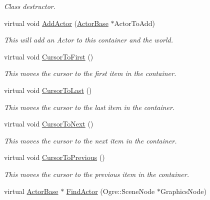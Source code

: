 \begin{DoxyCompactItemize}
\begin{DoxyCompactList}\small\item\em Class destructor. \item\end{DoxyCompactList}\item 
virtual void \hyperlink{classMezzanine_1_1ActorContainerVector_a1341d51fa9ed279301eed579a2de79b2}{AddActor} (\hyperlink{classMezzanine_1_1ActorBase}{ActorBase} $\ast$ActorToAdd)
\begin{DoxyCompactList}\small\item\em This will add an Actor to this container and the world. \item\end{DoxyCompactList}\item 
virtual void \hyperlink{classMezzanine_1_1ActorContainerVector_a2b09e4eac9bc6392f47dd81fb7592ce3}{CursorToFirst} ()
\begin{DoxyCompactList}\small\item\em This moves the cursor to the first item in the container. \item\end{DoxyCompactList}\item 
virtual void \hyperlink{classMezzanine_1_1ActorContainerVector_ae80f9d94f009293528bf1b4251bc8ad0}{CursorToLast} ()
\begin{DoxyCompactList}\small\item\em This moves the cursor to the last item in the container. \item\end{DoxyCompactList}\item 
virtual void \hyperlink{classMezzanine_1_1ActorContainerVector_a04cce1784a09023cb9db8cbc60a60d0c}{CursorToNext} ()
\begin{DoxyCompactList}\small\item\em This moves the cursor to the next item in the container. \item\end{DoxyCompactList}\item 
virtual void \hyperlink{classMezzanine_1_1ActorContainerVector_abe0d1ce8c8f6a83a7ef3c340a605e767}{CursorToPrevious} ()
\begin{DoxyCompactList}\small\item\em This moves the cursor to the previous item in the container. \item\end{DoxyCompactList}\item 
virtual \hyperlink{classMezzanine_1_1ActorBase}{ActorBase} $\ast$ \hyperlink{classMezzanine_1_1ActorContainerVector_a0155ddbb599b1653c37bdfcb261355d2}{FindActor} (Ogre::SceneNode $\ast$GraphicsNode)

\end{DoxyCompactItemize}
